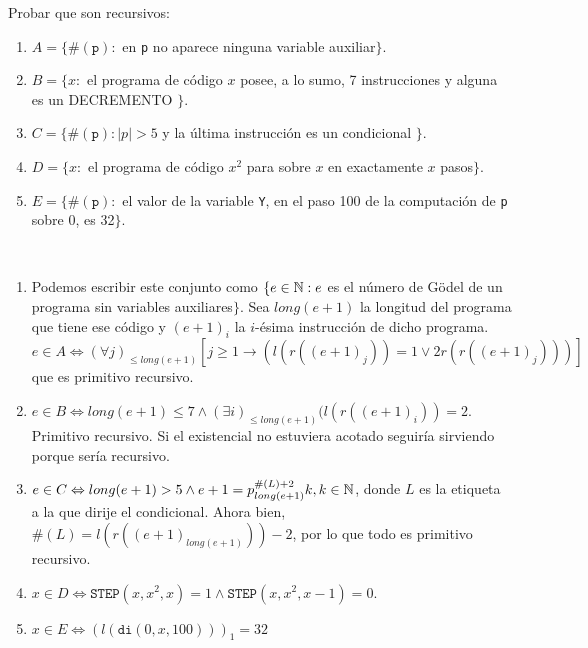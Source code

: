\documentclass[twoside]{article}
\begin{document}
\newpage
\begin{ejercicio}{6}
Probar que son recursivos:
\begin{enumerate}
\item $A = \{\#(\texttt{p}) :$ en \texttt{p} no aparece ninguna variable auxiliar$\}$.
\item $B = \{x :$ el programa de código $x$ posee, a lo sumo, 7 instrucciones y alguna es un DECREMENTO $\}$.
\item $C = \{\#(\texttt{p}) : |p| > 5$ y la última instrucción es un condicional $\}$.
\item $D = \{x :$ el programa de código $x^2$ para sobre $x$ en exactamente $x$ pasos$\}$.
\item $E = \{\#(\texttt{p}) :$ el valor de la variable \texttt{Y}, en el paso 100 de la computación de \texttt{p} sobre 0, es 32$\}$.
\end{enumerate}
\end{ejercicio}
\begin{solucion}\
\begin{enumerate}
\item Podemos escribir este conjunto como $\{e\in\mathbb{N}: e$ es el número de Gödel de un programa sin variables auxiliares$\}$. Sea $long(e+1)$ la longitud del programa que tiene ese código y $(e+1)_i$ la $i$-ésima instrucción de dicho programa. $e\in A\Leftrightarrow(\forall j)_{\leq long(e+1)}[j\geq 1\rightarrow (l(r((e+1)_j))=1\lor 2r(r((e+1)_j)))]$ que es primitivo recursivo.
\item $e\in B\Leftrightarrow long(e+1)\leq 7 \land (\exists i)_{\leq long(e+1)}(l(r((e+1)_i))=2$. Primitivo recursivo. Si el existencial no estuviera acotado seguiría sirviendo porque sería recursivo.
\item $e\in C\Leftrightarrow long(e+1)>5\land e+1=p_{long(e+1)}^{\#(L)+2}k, k\in\mathbb{N}$, donde $L$ es la etiqueta a la que dirije el condicional. Ahora bien, $\#(L)=l(r((e+1)_{long(e+1)}))-2$, por lo que todo es primitivo recursivo.
\item $x\in D\Leftrightarrow \texttt{STEP}(x,x^2,x)=1\land \texttt{STEP}(x,x^2,x-1)=0$. 
\item $x\in E\Leftrightarrow (l(\texttt{di}(0,x,100)))_1=32$
\end{enumerate}
\end{solucion}
\newpage
\end{document}
